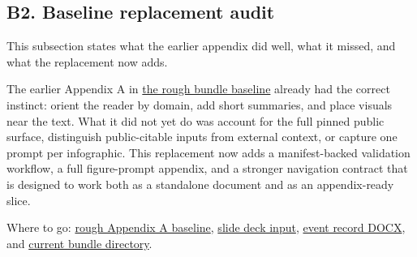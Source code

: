 \subsection{B2. Baseline replacement
audit}\label{b2.-baseline-replacement-audit}

This subsection states what the earlier appendix did well, what it
missed, and what the replacement now adds.

The earlier Appendix A in
\href{https://github.com/chris-page-gov/mcp-geo/blob/fe862910da246ca77f374cfbe484985f5df4d316/docs/mcp_geo_prism_bundle/main.md\#L122-L292}{the
rough bundle baseline} already had the correct instinct: orient the
reader by domain, add short summaries, and place visuals near the text.
What it did not yet do was account for the full pinned public surface,
distinguish public-citable inputs from external context, or capture one
prompt per infographic. This replacement now adds a manifest-backed
validation workflow, a full figure-prompt appendix, and a stronger
navigation contract that is designed to work both as a standalone
document and as an appendix-ready slice.

Where to go:
\href{https://github.com/chris-page-gov/mcp-geo/blob/fe862910da246ca77f374cfbe484985f5df4d316/docs/mcp_geo_prism_bundle/main.md\#L122-L292}{rough
Appendix A baseline},
\href{https://github.com/chris-page-gov/mcp-geo/blob/fe862910da246ca77f374cfbe484985f5df4d316/docs/slides/20260225\%20-\%20From_Apps_to_Answers.pdf}{slide
deck input},
\href{https://github.com/chris-page-gov/mcp-geo/blob/fe862910da246ca77f374cfbe484985f5df4d316/docs/reports/mcp_geo_ai_community_event_record.docx}{event
record DOCX}, and
\href{https://github.com/chris-page-gov/mcp-geo/tree/fe862910da246ca77f374cfbe484985f5df4d316/docs/mcp_geo_prism_bundle}{current
bundle directory}.

